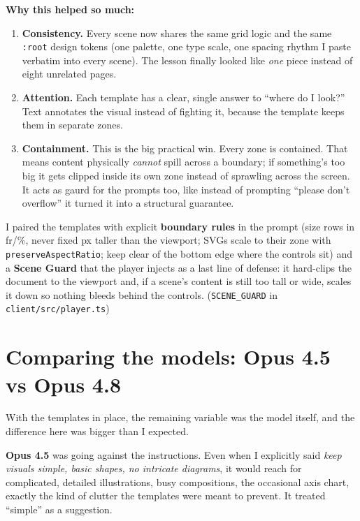 \documentclass[11pt]{article}
\newcommand{\code}[1]{\texttt{#1}}
\begin{document}
\textbf{Why this helped so much:}

\begin{enumerate}
  \item \textbf{Consistency.} Every scene now shares the same grid logic and the same
  \code{:root} design tokens (one palette, one type scale, one spacing rhythm I paste
  verbatim into every scene). The lesson finally looked like \emph{one} piece instead
  of eight unrelated pages.
  \item \textbf{Attention.} Each template has a clear, single answer to ``where do I look?''
  Text annotates the visual instead of fighting it, because the template keeps
  them in separate zones.
  \item \textbf{Containment.} This is the big practical win. Every zone is
  contained. That means content physically \emph{cannot} spill across a
  boundary; if something's too big it gets clipped inside its own zone instead
  of sprawling across the screen. It acts as gaurd for the prompts too, like instead of prompting ``please don't overflow''
  it turned it into a structural guarantee.
\end{enumerate}

I paired the templates with explicit \textbf{boundary rules} in the prompt (size rows
in fr/\%, never fixed px taller than the viewport; SVGs scale to their zone with
\code{preserveAspectRatio}; keep clear of the bottom edge where the controls sit) and
a \textbf{Scene Guard} that the player injects as a last line of defense: it hard-clips
the document to the viewport and, if a scene's content is still too tall or wide,
scales it down so nothing bleeds behind the controls. (\code{SCENE\_GUARD} in
\code{client/src/player.ts})

\hrulefill

\section*{Comparing the models: Opus 4.5 vs Opus 4.8}

With the templates in place, the remaining variable was the model itself, and the
difference here was bigger than I expected.

\textbf{Opus 4.5} was going against the instructions. Even when I explicitly said
\emph{keep visuals simple, basic shapes, no intricate diagrams}, it would reach for
complicated, detailed illustrations, busy compositions, the occasional axis chart,
exactly the kind of clutter the templates were meant to prevent. It treated
``simple'' as a suggestion.
\end{document}
